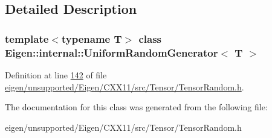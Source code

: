 \subsection{Detailed Description}
\subsubsection*{template$<$typename T$>$\newline
class Eigen\+::internal\+::\+Uniform\+Random\+Generator$<$ T $>$}



Definition at line \hyperlink{eigen_2unsupported_2_eigen_2_c_x_x11_2src_2_tensor_2_tensor_random_8h_source_l00142}{142} of file \hyperlink{eigen_2unsupported_2_eigen_2_c_x_x11_2src_2_tensor_2_tensor_random_8h_source}{eigen/unsupported/\+Eigen/\+C\+X\+X11/src/\+Tensor/\+Tensor\+Random.\+h}.



The documentation for this class was generated from the following file\+:\begin{DoxyCompactItemize}
\item 
eigen/unsupported/\+Eigen/\+C\+X\+X11/src/\+Tensor/\+Tensor\+Random.\+h\end{DoxyCompactItemize}
